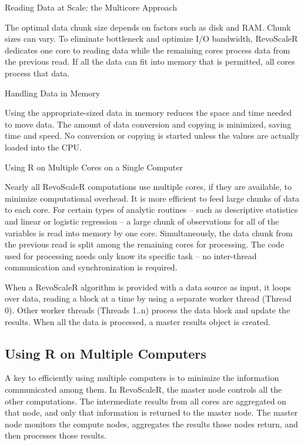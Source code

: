 Reading Data at Scale: the Multicore Approach

The optimal data chunk size depends on factors such as disk and RAM. Chunk sizes can vary. To eliminate bottleneck and optimize I/O bandwidth, RevoScaleR dedicates one core to reading data while the remaining cores process data from the previous read. If all the data can fit into memory that is permitted, all cores process that data.

Handling Data in Memory

Using the appropriate-sized data in memory reduces the space and time needed to move data. The amount of data conversion and copying is minimized, saving time and speed. No conversion or copying is started unless the values are actually loaded into the CPU.

Using R on Multiple Cores on a Single Computer

Nearly all RevoScaleR computations use multiple cores, if they are available, to minimize computational overhead. It is more efficient to feed large chunks of data to each core. For certain types of analytic routines -- such as descriptive statistics and linear or logistic regression -- a large chunk of observations for all of the variables is read into memory by one core. Simultaneously, the data chunk from the previous read is split among the remaining cores for processing. The code used for processing needs only know its specific task -- no inter-thread communication and synchronization is required.

When a RevoScaleR algorithm is provided with a data source as input, it loops over data, reading a block at a time by using a separate worker thread (Thread 0). Other worker threads (Threads 1..n) process the data block and update the results. When all the data is processed, a master results object is created.

\subsection*{Using R on Multiple Computers}

A key to efficiently using multiple computers is to minimize the information communicated among them. In RevoScaleR, the master node controls all the other computations. The intermediate results from all cores are aggregated on that node, and only that information is returned to the master node. The master node monitors the compute nodes, aggregates the results those nodes return, and then processes those results.

